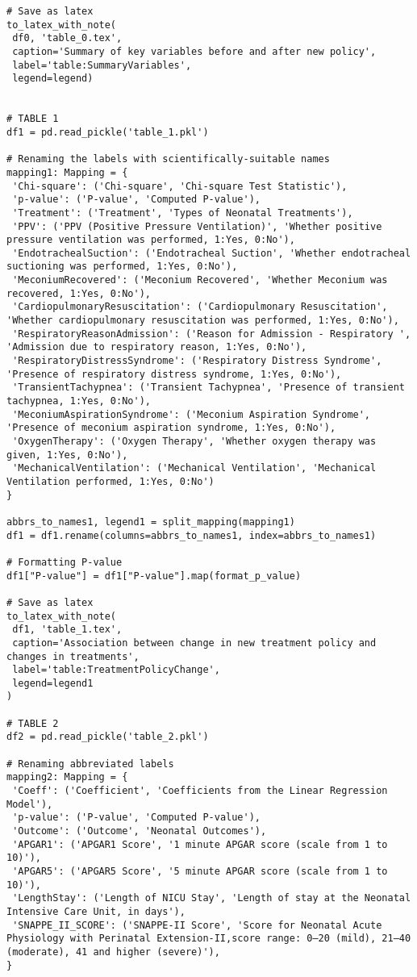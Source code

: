 \documentclass[11pt]{article}
\begin{document}
\begin{verbatim}
# Save as latex
to_latex_with_note(
 df0, 'table_0.tex',
 caption='Summary of key variables before and after new policy', 
 label='table:SummaryVariables',
 legend=legend)


# TABLE 1
df1 = pd.read_pickle('table_1.pkl')

# Renaming the labels with scientifically-suitable names
mapping1: Mapping = {
 'Chi-square': ('Chi-square', 'Chi-square Test Statistic'),
 'p-value': ('P-value', 'Computed P-value'),
 'Treatment': ('Treatment', 'Types of Neonatal Treatments'),
 'PPV': ('PPV (Positive Pressure Ventilation)', 'Whether positive pressure ventilation was performed, 1:Yes, 0:No'),
 'EndotrachealSuction': ('Endotracheal Suction', 'Whether endotracheal suctioning was performed, 1:Yes, 0:No'),
 'MeconiumRecovered': ('Meconium Recovered', 'Whether Meconium was recovered, 1:Yes, 0:No'),
 'CardiopulmonaryResuscitation': ('Cardiopulmonary Resuscitation', 'Whether cardiopulmonary resuscitation was performed, 1:Yes, 0:No'),
 'RespiratoryReasonAdmission': ('Reason for Admission - Respiratory ', 'Admission due to respiratory reason, 1:Yes, 0:No'),
 'RespiratoryDistressSyndrome': ('Respiratory Distress Syndrome', 'Presence of respiratory distress syndrome, 1:Yes, 0:No'),
 'TransientTachypnea': ('Transient Tachypnea', 'Presence of transient tachypnea, 1:Yes, 0:No'),
 'MeconiumAspirationSyndrome': ('Meconium Aspiration Syndrome', 'Presence of meconium aspiration syndrome, 1:Yes, 0:No'),
 'OxygenTherapy': ('Oxygen Therapy', 'Whether oxygen therapy was given, 1:Yes, 0:No'),
 'MechanicalVentilation': ('Mechanical Ventilation', 'Mechanical Ventilation performed, 1:Yes, 0:No')
}

abbrs_to_names1, legend1 = split_mapping(mapping1)
df1 = df1.rename(columns=abbrs_to_names1, index=abbrs_to_names1)

# Formatting P-value
df1["P-value"] = df1["P-value"].map(format_p_value)

# Save as latex
to_latex_with_note(
 df1, 'table_1.tex',
 caption='Association between change in new treatment policy and changes in treatments', 
 label='table:TreatmentPolicyChange',
 legend=legend1
)

# TABLE 2
df2 = pd.read_pickle('table_2.pkl')

# Renaming abbreviated labels
mapping2: Mapping = {
 'Coeff': ('Coefficient', 'Coefficients from the Linear Regression Model'),
 'p-value': ('P-value', 'Computed P-value'),
 'Outcome': ('Outcome', 'Neonatal Outcomes'),
 'APGAR1': ('APGAR1 Score', '1 minute APGAR score (scale from 1 to 10)'),
 'APGAR5': ('APGAR5 Score', '5 minute APGAR score (scale from 1 to 10)'),
 'LengthStay': ('Length of NICU Stay', 'Length of stay at the Neonatal Intensive Care Unit, in days'),
 'SNAPPE_II_SCORE': ('SNAPPE-II Score', 'Score for Neonatal Acute Physiology with Perinatal Extension-II,score range: 0–20 (mild), 21–40 (moderate), 41 and higher (severe)'),
}


\end{verbatim}
\end{document}
